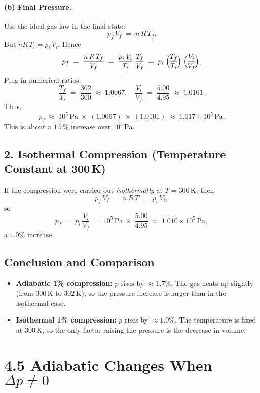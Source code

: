 \documentclass[12pt]{article}
\theoremstyle{definition} %
\theoremstyle{plain} %
\begin{document}
\paragraph{(b) Final Pressure.}
Use the ideal gas law in the final state:
\[
p_f \, V_f 
\;=\;
n\,R\,T_f.
\]
But $nR\,T_i = p_i\,V_i$.  Hence
\[
p_f
\;=\;
\frac{n\,R\,T_f}{V_f}
\;=\;
\frac{p_i \,V_i}{T_i}
\;\frac{T_f}{V_f}
\;=\;
p_i
\;\Bigl(\!\frac{T_f}{T_i}\!\Bigr)
\;\Bigl(\!\frac{V_i}{V_f}\!\Bigr).
\]
Plug in numerical ratios:
\[
\frac{T_f}{T_i}
\;=\;
\frac{302}{300}
\;\approx\;
1.0067,
\quad
\frac{V_i}{V_f}
\;=\;
\frac{5.00}{4.95}
\;\approx\;
1.0101.
\]
Thus,
\[
p_f 
\;\approx\;
10^5\,\mathrm{Pa}
\;\times\;
(1.0067)
\;\times\;
(1.0101)
\;\approx\;
1.017 \times 10^5\,\mathrm{Pa}.
\]
This is about a \(\boxed{1.7\%\text{ increase}}\) over $10^5\,\mathrm{Pa}$.

\subsection*{2. Isothermal Compression (Temperature Constant at 300\,K)}

If the compression were carried out \emph{isothermally} at $T=300\,\mathrm{K}$, then
\[
p_f \, V_f 
\;=\;
n\,R\,T
\;=\;
p_i \, V_i,
\]
so
\[
p_f
\;=\;
p_i\,\frac{V_i}{V_f}
\;=\;
10^5\,\mathrm{Pa}
\;\times\;
\frac{5.00}{4.95}
\;\approx\;
1.010 \times 10^5\,\mathrm{Pa},
\]
a \(\boxed{1.0\%\text{ increase}}\).

\subsection*{Conclusion and Comparison}

\begin{itemize}
  \item \textbf{Adiabatic 1\% compression:} 
    $p$ rises by \(\approx 1.7\%\). 
    The gas heats up slightly (from $300\,\mathrm{K}$ to $302\,\mathrm{K}$), so the pressure increase is larger than in the isothermal case.
  \item \textbf{Isothermal 1\% compression:} 
    $p$ rises by \(\approx 1.0\%\). 
    The temperature is fixed at $300\,\mathrm{K}$, so the only factor raising the pressure is the decrease in volume.
\end{itemize}

\section*{4.5 Adiabatic Changes When \texorpdfstring{$\Delta p \neq 0$}{Δp ≠ 0}}
\end{document}
